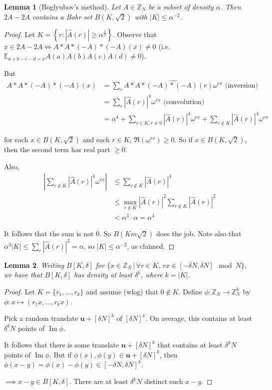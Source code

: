 \documentclass[a4paper]{article}
\newtheorem{lemma}{Lemma}
\newcommand*\abs[1]{\left|#1\right|}
\DeclareMathOperator{\im}{Im}
\begin{document}
\begin{lemma}[Boglyubov's method]
	Let $A \in \mathbb{Z}_N$ be a subset of density $\alpha$. Then $2A-2A$ contains a Bohr set $B(K, \sqrt{2})$ with $\abs{K} \leq \alpha^{-2}$.
\end{lemma}
\begin{proof}
	Let $K = \left\{r: \abs{\hat{A}(r)} \geq \alpha^{\frac{3}{2}} \right\}$. Observe that $x \in 2A-2A \iff A * A * (-A) * (-A)(x) \neq 0$ (i.e. $\mathbb{E}_{a+b-c-d=x}A(a)A(b)A(c)A(d) \neq 0$).
	
	But
	\begin{align*}
	A*A*(-A)*(-A)(x) &= \sum_r \widehat{A*A*(-A)*(-A)(r)\omega^{rx}} \text{ (inversion)} \\
	&= \sum_r \abs{\hat{A}(r)}^4 \omega^{rx} \text{ (convolution)} \\
	&= \alpha^4 + \sum_{r \in K, r \neq 0} \abs{\hat{A}(r)}^4 \omega^{rx} + \sum_{r \not\in K} \abs{\hat{A}(r)}^4 \omega^{rx}
	\end{align*}
	
	for each $x \in B(K, \sqrt{2})$ and each $r \in K$, $\Re(\omega^{rx}) \geq 0$. So if $x \in B(K, \sqrt{2})$, then the second term has real part $\geq 0$.
	
	Also,
	\begin{align*}
		\abs{\sum_{r \not\in K} \abs{\hat{A}(r)}^4 \omega^{rx}} &\leq \sum_{r \not\in K} \abs{\hat{A}(r)}^4 \\
		&\leq \max_{r \not\in K}\abs{\hat{A}(r)}^2 \sum_{r \not\in K} \abs{\hat{A}(r)}^2\\
		&< \alpha^3 \cdot \alpha = \alpha^4
	\end{align*}
	
	It follows that the sum is not 0. So $B(Km \sqrt{2})$ does the job. Note also that $\alpha^3 \abs{K} \leq \sum_r\abs{\hat{A}(r)}^2 = \alpha$, so $\abs{K} \leq \alpha^{-2}$, as claimed.
\end{proof}

\begin{lemma}
	Writing $B[K, \delta]$ for $\{x \in \mathbb{Z}_N \,|\, \forall r \in K,\, rx \in [-\delta N, \delta N] \mod N \}$, we have that $B[K, \delta]$ has density at least $\delta^k$, where $k = \abs{K}$.
\end{lemma}

\begin{proof}
	Let $K=\{r_1,\dots,r_k\}$ and assume (wlog) that $0 \not\in K$. Define $\phi: \mathbb{Z}_N \to \mathbb{Z}_N^k$ by $\phi: x \mapsto (r_1x,\dots,r_kx)$.
	
	Pick a random translate $\boldsymbol{u} + [\delta N]^k$ of $[\delta N]^k$. On average, this contains at least $\delta^k N$ points of $\im \phi$.
	
	It follows that there is some translate $\boldsymbol{u} + [\delta N]^k$ that contains at least $\delta^k N$ points of $\im \phi$. But if $\phi(x), \phi(y) \in \boldsymbol{u} + [\delta N]^k$, then $\phi(x-y) = \phi(x)-\phi(y) \in [-\delta N, \delta N]^k$.
	
	$\implies x-y \in B[K, \delta]$. There are at least $\delta^k N$ distinct such $x-y$.
\end{proof}
\end{document}
